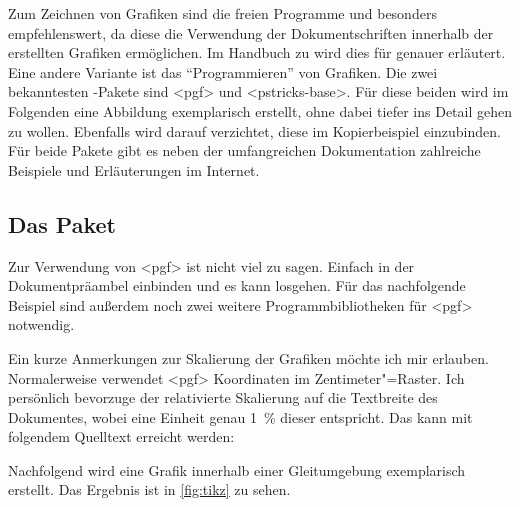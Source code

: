\documentclass[%
  english,ngerman,%
  cdgeometry=no,DIV=12,automark,%
]{tudscrartcl}
\begin{document}
Zum Zeichnen von Grafiken sind die freien Programme  und 
besonders  empfehlenswert, da diese die Verwendung der 
Dokumentschriften innerhalb der erstellten Grafiken ermöglichen. Im Handbuch zu 
\TUDScript wird dies für  
genauer erläutert. Eine andere Variante ist das \enquote{Programmieren} von 
Grafiken. Die zwei bekanntesten -Pakete sind <pgf> 
und <pstricks-base>. Für diese beiden wird im Folgenden eine 
Abbildung exemplarisch erstellt, ohne dabei tiefer ins Detail gehen zu wollen. 
Ebenfalls wird darauf verzichtet, diese im Kopierbeispiel einzubinden. Für 
beide Pakete gibt es neben der umfangreichen Dokumentation zahlreiche Beispiele 
und Erläuterungen im Internet.


\subsection{Das Paket }
Zur Verwendung von <pgf> ist nicht viel zu sagen. Einfach in der 
Dokumentpräambel einbinden und es kann losgehen. Für das nachfolgende Beispiel 
sind außerdem noch zwei weitere Programmbibliotheken für <pgf> 
notwendig.
%
\begin{Hint}
\usepackage{tikz}
\usetikzlibrary{chains}
\usetikzlibrary{decorations.markings}
\tikzset{on grid}
\end{Hint}
%
Ein kurze Anmerkungen zur Skalierung der Grafiken möchte ich mir erlauben. 
Normalerweise verwendet <pgf> Koordinaten im Zentimeter"=Raster. 
Ich persönlich bevorzuge der relativierte Skalierung auf die Textbreite des 
Dokumentes, wobei eine Einheit genau \SI{1}{\percent} dieser entspricht. Das 
kann mit folgendem Quelltext erreicht werden:
%
\CodeHook{\renewcommand\newlength[1]{}}
\begin{Hint*}
\newlength{\tikzunit}
\setlength{\tikzunit}{.01\textwidth}
\tikzset{x=\tikzunit,y=\tikzunit}
\end{Hint*}
%
Nachfolgend wird eine Grafik innerhalb einer Gleitumgebung exemplarisch 
erstellt. Das Ergebnis ist in \autoref{fig:tikz} zu sehen.
\end{document}
